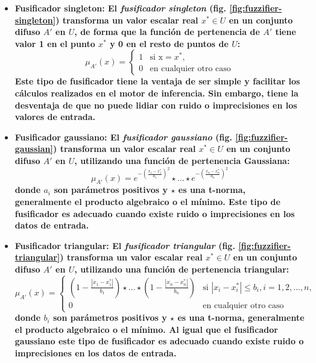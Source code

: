 \begin{itemize}
\item\bfseries Fusificador singleton: \normalfont El \emph{fusificador singleton} (fig. \ref{fig:fuzzifier-singleton}) transforma un valor escalar real $x^* \in U$ en un conjunto difuso $A'$ en $U$, de forma que la función de pertenencia de $A'$ tiene valor 1 en el punto $x^*$ y 0 en el resto de puntos de $U$:
\begin{equation}
\mu_{A'}(x) = \begin{cases} 1 & \mbox{si } \mbox{x}=x^*, \\ 0 & \mbox{en cualquier otro caso} \end{cases}
\end{equation}
Este tipo de fusificador tiene la ventaja de ser simple y facilitar los cálculos realizados en el motor de inferencia. Sin embargo, tiene la desventaja de que no puede lidiar con ruido o imprecisiones en los valores de entrada. 
\item\bfseries Fusificador gaussiano: \normalfont El \emph{fusificador gaussiano} (fig. \ref{fig:fuzzifier-gaussian}) transforma un valor escalar real $x^* \in U$ en un conjunto difuso $A'$ en $U$, utilizando una función de pertenencia Gaussiana:
\begin{equation}
\mu_{A'}(x) = e^{-(\frac{x_1 - x_1^*}{a_1})^2}\star\ldots\star e^{-(\frac{x_n - x_n^*}{a_n})^2}
\end{equation}
donde $a_i$ son parámetros positivos y $\star$ es una t-norma, generalmente el producto algebraico o el mínimo. Este tipo de fusificador es adecuado cuando existe ruido o imprecisiones en los datos de entrada.
\item\bfseries Fusificador triangular: \normalfont El \emph{fusificador triangular} (fig. \ref{fig:fuzzifier-triangular}) transforma un valor escalar real $x^* \in U$ en un conjunto difuso $A'$ en $U$, utilizando una función de pertenencia triangular:
\begin{equation}
\mu_{A'}(x) = \begin{cases} (1 - \frac{|x_1 - x_1^*|}{b_1})\star\ldots\star  (1 - \frac{|x_n - x_n^*|}{b_n}) & \mbox{si } |x_i - x_i^*| \leq b_i, i = 1,2,\ldots,n, \\ 0 & \mbox{en cualquier otro caso} \end{cases}
\end{equation}
donde $b_i$ son parámetros positivos y $\star$ es una t-norma, generalmente el producto algebraico o el mínimo. Al igual que el fusificador gaussiano este tipo de fusificador es adecuado cuando existe ruido o imprecisiones en los datos de entrada.
\end{itemize}

